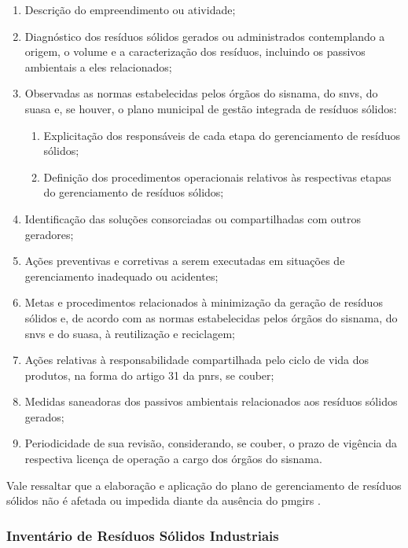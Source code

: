 	\begin{enumerate}[label=\Roman*]
		\item Descrição do empreendimento ou atividade;
		\item Diagnóstico dos resíduos sólidos gerados ou administrados contemplando a origem, o volume e a caracterização dos resíduos, incluindo os passivos ambientais a eles relacionados;
		\item Observadas as normas estabelecidas pelos órgãos do \gls{sisnama}, do \gls{snvs}, do \gls{suasa} e, se houver, o plano municipal de gestão integrada de resíduos sólidos:
		\begin{enumerate}[label=(\alph*)] 
			\item Explicitação dos responsáveis de cada etapa do gerenciamento de resíduos sólidos;
			\item Definição dos procedimentos operacionais relativos às respectivas etapas do gerenciamento de resíduos sólidos;
		\end{enumerate}
		\item Identificação das soluções consorciadas ou compartilhadas com outros geradores;
		\item Ações preventivas e corretivas a serem executadas em situações de gerenciamento inadequado ou acidentes;
		\item Metas e procedimentos relacionados à minimização da geração de resíduos sólidos e, de acordo com as normas estabelecidas pelos órgãos do \gls{sisnama}, do \gls{snvs} e do \gls{suasa}, à reutilização e reciclagem;
		\item Ações relativas à responsabilidade compartilhada pelo ciclo de vida dos produtos, na forma do artigo 31 da \gls{pnrs}, se couber;
		\item Medidas saneadoras dos passivos ambientais relacionados aos resíduos sólidos gerados;
		\item Periodicidade de sua revisão, considerando, se couber, o prazo de vigência da respectiva licença de operação a cargo dos órgãos do \gls{sisnama}.
	\end{enumerate}

	Vale ressaltar que a elaboração e aplicação do plano de gerenciamento de resíduos sólidos não é afetada ou impedida diante da ausência do \gls{pmgirs} \cite{brasil:12305}.

	\subsubsection{Inventário de Resíduos Sólidos Industriais}
	
